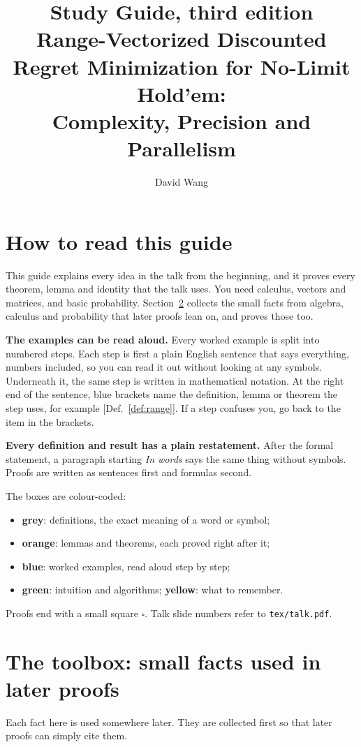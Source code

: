 \documentclass[11pt]{article}
\title{Study Guide, third edition\\[4pt]\large Range-Vectorized Discounted Regret Minimization for No-Limit Hold'em:\\ Complexity, Precision and Parallelism}
\author{David Wang}\date{}
\theoremstyle{definition}
\newcommand{\Def}[1]{Def.~\ref{#1}}\newcommand{\Lem}[1]{Lemma~\ref{#1}}\newcommand{\Thm}[1]{Thm.~\ref{#1}}
\begin{document}
\maketitle
\vspace{-2em}

\section{How to read this guide}
This guide explains every idea in the talk from the beginning, and it proves every theorem, lemma and identity that the
talk uses. You need calculus, vectors and matrices, and basic probability. Section~\ref{sec:tool} collects the small
facts from algebra, calculus and probability that later proofs lean on, and proves those too.

\textbf{The examples can be read aloud.} Every worked example is split into numbered steps. Each step is first a
plain English sentence that says everything, numbers included, so you can read it out without looking at any
symbols. Underneath it, the same step is written in mathematical notation. At the right end of the sentence, blue
brackets name the definition, lemma or theorem the step uses, for example {\small\color{blue!50!black}[\Def{def:range}]}.
If a step confuses you, go back to the item in the brackets.

\textbf{Every definition and result has a plain restatement.} After the formal statement, a paragraph starting
\textit{In words} says the same thing without symbols. Proofs are written as sentences first and formulas second.

The boxes are colour-coded:
\begin{itemize}[nosep]
\item \textbf{grey}: definitions, the exact meaning of a word or symbol;
\item \textbf{orange}: lemmas and theorems, each proved right after it;
\item \textbf{blue}: worked examples, read aloud step by step;
\item \textbf{green}: intuition and algorithms; \textbf{yellow}: what to remember.
\end{itemize}
Proofs end with a small square $\square$. Talk slide numbers refer to \texttt{tex/talk.pdf}.

\tableofcontents
\newpage

\section{The toolbox: small facts used in later proofs}\label{sec:tool}
Each fact here is used somewhere later. They are collected first so that later proofs can simply cite them.
\end{document}
